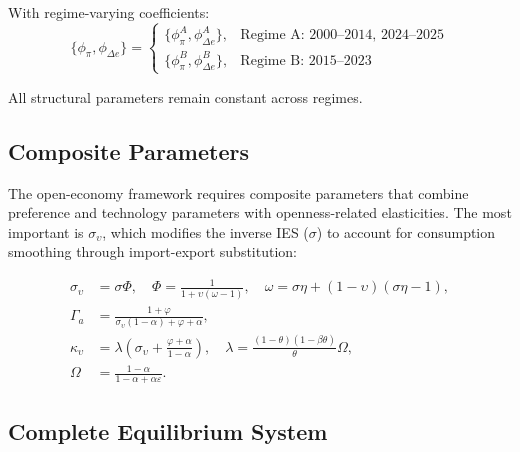\documentclass[12pt,a4paper]{article}
\begin{document}
\begin{appendices}
With regime-varying coefficients:
\begin{equation}
	\boxed{\{\phi_\pi, \phi_{\Delta e}\} = 
		\begin{cases}
			\{\phi_\pi^A, \phi_{\Delta e}^A\}, & \text{Regime A: 2000--2014, 2024--2025} \\
			\{\phi_\pi^B, \phi_{\Delta e}^B\}, & \text{Regime B: 2015--2023}
	\end{cases}}
	\label{eq:app_regime}
	\tag{Regime-dependent}
\end{equation}

All structural parameters remain constant across regimes.

\subsection{Composite Parameters}
\label{app:composite_params}

The open-economy framework requires composite parameters that combine 
preference and technology parameters with openness-related elasticities. 
The most important is $\sigma_\upsilon$, which modifies the inverse IES 
($\sigma$) to account for consumption smoothing through import-export 
substitution:

\begin{align}
	\sigma_\upsilon &= \sigma \Phi, \quad \Phi = \frac{1}{1+\upsilon(\omega-1)}, \quad \omega = \sigma\eta + (1-\upsilon)(\sigma\eta-1), \\
	\Gamma_a &= \frac{1+\varphi}{\sigma_\upsilon(1-\alpha)+\varphi+\alpha}, \\
	\kappa_\upsilon &= \lambda\left(\sigma_\upsilon + \frac{\varphi+\alpha}{1-\alpha}\right), \quad \lambda = \frac{(1-\theta)(1-\beta\theta)}{\theta}\Omega, \\
	\Omega &= \frac{1-\alpha}{1-\alpha+\alpha\varepsilon}.
\end{align}

\subsection{Complete Equilibrium System}
\label{app:equilibrium}


\end{appendices}
\end{document}
